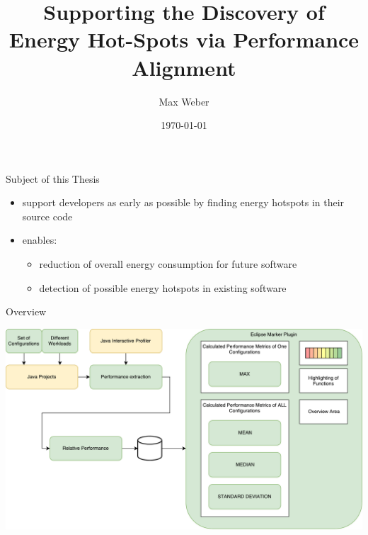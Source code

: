 \documentclass[11pt,aspectratio=169]{beamer}
\title[Green Development]{Supporting the Discovery of Energy Hot-Spots via Performance Alignment}
\author[M. Weber]{Max Weber}
\institute[Bauhaus-Universität Weimar]{}
\date[\today]{\today}
\begin{document}

\maketitle



\begin{frame}{Subject of this Thesis}
  \begin{itemize}
    \item support developers as early as possible by finding energy hotspots in their source code
    \item enables:
    \begin{itemize}
      \item reduction of overall energy consumption for future software
      \item detection of possible energy hotspots in existing software
    \end{itemize}
  \end{itemize}
\end{frame}


\begin{frame}{Overview}
  \begin{center}
    \includegraphics[height=0.83\textheight]{./images/Workflow_Green_DEV_0.pdf}
  \end{center}
\end{frame}
\end{document}
